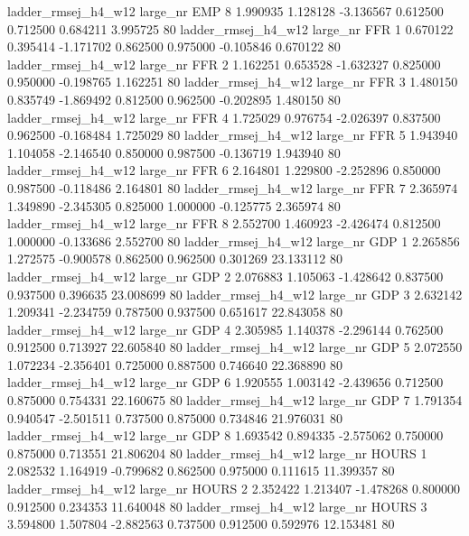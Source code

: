 ladder_rmsej_h4_w12   large_nr      EMP                 8  1.990935  1.128128  -3.136567 0.612500 0.712500  0.684211    3.995725 80
ladder_rmsej_h4_w12   large_nr      FFR                 1  0.670122  0.395414  -1.171702 0.862500 0.975000 -0.105846    0.670122 80
ladder_rmsej_h4_w12   large_nr      FFR                 2  1.162251  0.653528  -1.632327 0.825000 0.950000 -0.198765    1.162251 80
ladder_rmsej_h4_w12   large_nr      FFR                 3  1.480150  0.835749  -1.869492 0.812500 0.962500 -0.202895    1.480150 80
ladder_rmsej_h4_w12   large_nr      FFR                 4  1.725029  0.976754  -2.026397 0.837500 0.962500 -0.168484    1.725029 80
ladder_rmsej_h4_w12   large_nr      FFR                 5  1.943940  1.104058  -2.146540 0.850000 0.987500 -0.136719    1.943940 80
ladder_rmsej_h4_w12   large_nr      FFR                 6  2.164801  1.229800  -2.252896 0.850000 0.987500 -0.118486    2.164801 80
ladder_rmsej_h4_w12   large_nr      FFR                 7  2.365974  1.349890  -2.345305 0.825000 1.000000 -0.125775    2.365974 80
ladder_rmsej_h4_w12   large_nr      FFR                 8  2.552700  1.460923  -2.426474 0.812500 1.000000 -0.133686    2.552700 80
ladder_rmsej_h4_w12   large_nr      GDP                 1  2.265856  1.272575  -0.900578 0.862500 0.962500  0.301269   23.133112 80
ladder_rmsej_h4_w12   large_nr      GDP                 2  2.076883  1.105063  -1.428642 0.837500 0.937500  0.396635   23.008699 80
ladder_rmsej_h4_w12   large_nr      GDP                 3  2.632142  1.209341  -2.234759 0.787500 0.937500  0.651617   22.843058 80
ladder_rmsej_h4_w12   large_nr      GDP                 4  2.305985  1.140378  -2.296144 0.762500 0.912500  0.713927   22.605840 80
ladder_rmsej_h4_w12   large_nr      GDP                 5  2.072550  1.072234  -2.356401 0.725000 0.887500  0.746640   22.368890 80
ladder_rmsej_h4_w12   large_nr      GDP                 6  1.920555  1.003142  -2.439656 0.712500 0.875000  0.754331   22.160675 80
ladder_rmsej_h4_w12   large_nr      GDP                 7  1.791354  0.940547  -2.501511 0.737500 0.875000  0.734846   21.976031 80
ladder_rmsej_h4_w12   large_nr      GDP                 8  1.693542  0.894335  -2.575062 0.750000 0.875000  0.713551   21.806204 80
ladder_rmsej_h4_w12   large_nr    HOURS                 1  2.082532  1.164919  -0.799682 0.862500 0.975000  0.111615   11.399357 80
ladder_rmsej_h4_w12   large_nr    HOURS                 2  2.352422  1.213407  -1.478268 0.800000 0.912500  0.234353   11.640048 80
ladder_rmsej_h4_w12   large_nr    HOURS                 3  3.594800  1.507804  -2.882563 0.737500 0.912500  0.592976   12.153481 80
